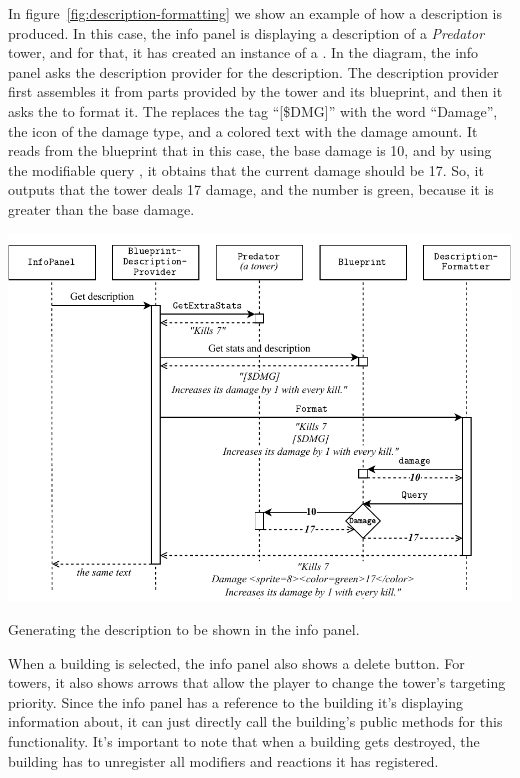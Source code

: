In figure~\ref{fig:description-formatting} we show an example of how a description is produced.
In this case, the info panel is displaying a description of a \emph{Predator} tower, and for that, it has created an instance of a .
In the diagram, the info panel asks the description provider for the description.
The description provider first assembles it from parts provided by the tower and its blueprint, and then it asks the  to format it.
The  replaces the tag \enquote{[\$DMG]} with the word \enquote{Damage}, the icon of the damage type, and a colored text with the damage amount.
It reads from the blueprint that in this case, the base damage is 10, and by using the modifiable query , it obtains that the current damage should be 17.
So, it outputs that the tower deals 17 damage, and the number is green, because it is greater than the base damage.

\begin{center}
    \captionsetup{type=figure}
    \includegraphics[width=\textwidth]{img/description formatting.pdf}
    \caption{Generating the description to be shown in the info panel.}
    \label{fig:description-formatting}
\end{center}

When a building is selected, the info panel also shows a delete button.
For towers, it also shows arrows that allow the player to change the tower's targeting priority.
Since the info panel has a reference to the building it's displaying information about, it can just directly call the building's public methods for this functionality.
It's important to note that when a building gets destroyed, the building has to unregister all modifiers and reactions it has registered.

